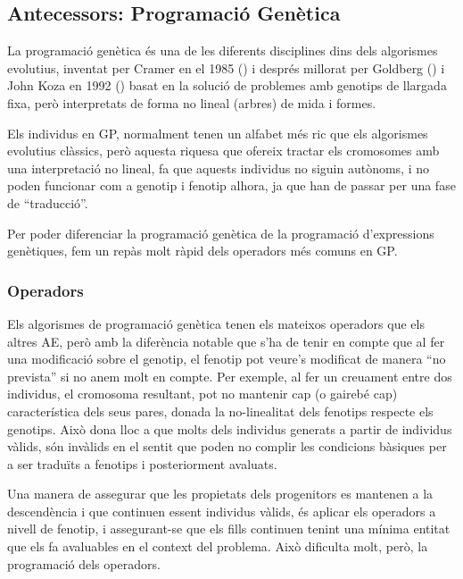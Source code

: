 \subsection{Antecessors: Programació Genètica} %
\label{sub:Ant. Programacio Genetica}
La programació genètica és una de les diferents disciplines dins dels algorismes
evolutius, inventat per Cramer en el 1985 (\cite{C85}) i després millorat per
Goldberg (\cite{Goldberg:89}) i
John Koza en 1992 (\cite{koza:92}) basat en la solució de problemes amb genotips de
llargada fixa, però interpretats de forma no lineal (arbres) de mida i formes.

Els individus en GP, normalment tenen un alfabet més ric que els algorismes
evolutius clàssics, però aquesta riquesa que ofereix tractar els cromosomes amb
una interpretació no lineal, fa que aquests individus no siguin autònoms, i no
poden funcionar com a genotip i fenotip alhora, ja que han de passar per una
fase de ``traducció''.

Per poder diferenciar la programació genètica de la programació d'expressions
genètiques, fem un repàs molt ràpid dels operadors més comuns en GP.

\subsubsection{Operadors} %
\label{ssub:operadors}

Els algorismes de programació genètica tenen els mateixos operadors que els
altres AE, però amb la diferència notable que s'ha de tenir en compte que al fer
una modificació sobre el genotip, el fenotip pot veure's modificat de manera
``no prevista'' si no anem molt en compte.  Per exemple, al fer un creuament
entre dos individus, el cromosoma resultant, pot no mantenir cap (o gairebé
cap) característica dels seus pares, donada la no-linealitat dels fenotips
respecte els genotips.  Això dona lloc a que molts dels individus generats a
partir de individus vàlids, són invàlids en el sentit que poden no complir les
condicions bàsiques per a ser traduïts a fenotips i posteriorment avaluats.

Una manera de assegurar que les propietats dels progenitors es mantenen a la
descendència i que continuen essent individus vàlids, és aplicar els operadors
a nivell de fenotip, i assegurant-se que els fills continuen tenint una mínima
entitat que els fa avaluables en el context del problema.  Això dificulta molt,
però, la programació dels operadors.

